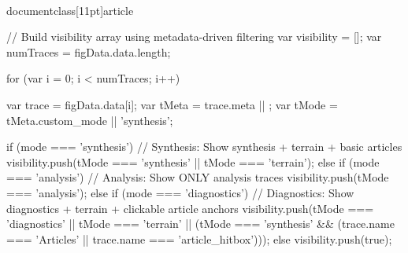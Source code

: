 \\documentclass[11pt]{article}
\begin{document}
\begin{CodeBlock}
{{{{{{{{            // Build visibility array using metadata-driven filtering
            var visibility = [];
            var numTraces = figData.data.length;

            for (var i = 0; i < numTraces; i++) {{
                var trace = figData.data[i];
                var tMeta = trace.meta || {{}};
                var tMode = tMeta.custom_mode || 'synthesis';
                
                if (mode === 'synthesis') {{
                    // Synthesis: Show synthesis + terrain + basic articles
                    visibility.push(tMode === 'synthesis' || tMode === 'terrain');
                }} else if (mode === 'analysis') {{
                    // Analysis: Show ONLY analysis traces
                    visibility.push(tMode === 'analysis');
                }} else if (mode === 'diagnostics') {{
                    // Diagnostics: Show diagnostics + terrain + clickable article anchors
                    visibility.push(tMode === 'diagnostics' || tMode === 'terrain' || (tMode === 'synthesis' && (trace.name === 'Articles' || trace.name === 'article_hitbox')));
                }} else {{
                    visibility.push(true);
                }}
            }}

}}}}}}}}
\end{CodeBlock}
\end{document}
